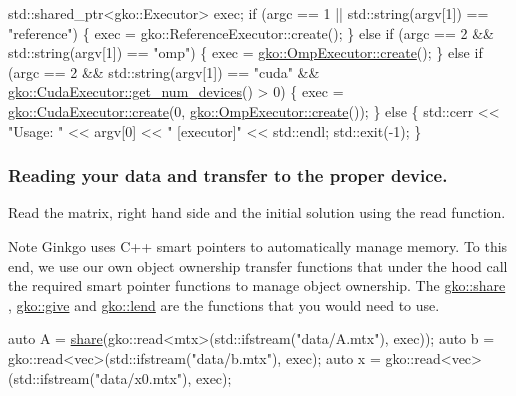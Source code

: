 \begin{DoxyCode}
std::shared\_ptr<gko::Executor> exec;
\textcolor{keywordflow}{if} (argc == 1 || std::string(argv[1]) == \textcolor{stringliteral}{"reference"}) \{
    exec = gko::ReferenceExecutor::create();
\} \textcolor{keywordflow}{else} \textcolor{keywordflow}{if} (argc == 2 && std::string(argv[1]) == \textcolor{stringliteral}{"omp"}) \{
    exec = \hyperlink{classgko_1_1OmpExecutor_a33ca05fdd0fc928ee262fc9425304874}{gko::OmpExecutor::create}();
\} \textcolor{keywordflow}{else} \textcolor{keywordflow}{if} (argc == 2 && std::string(argv[1]) == \textcolor{stringliteral}{"cuda"} &&
           \hyperlink{classgko_1_1CudaExecutor_aef0258494d14de0e56149b920c5173e5}{gko::CudaExecutor::get\_num\_devices}() > 0) \{
    exec = \hyperlink{classgko_1_1CudaExecutor_a2718a92034350650ef406ffdb60db090}{gko::CudaExecutor::create}(0, 
      \hyperlink{classgko_1_1OmpExecutor_a33ca05fdd0fc928ee262fc9425304874}{gko::OmpExecutor::create}());
\} \textcolor{keywordflow}{else} \{
    std::cerr << \textcolor{stringliteral}{"Usage: "} << argv[0] << \textcolor{stringliteral}{" [executor]"} << std::endl;
    std::exit(-1);
\}
\end{DoxyCode}


\label{_Readingyourdataandtransfertotheproperdevice}%
 \subsubsection*{Reading your data and transfer to the proper device.}

Read the matrix, right hand side and the initial solution using the read function. \begin{DoxyNote}{Note}
Ginkgo uses C++ smart pointers to automatically manage memory. To this end, we use our own object ownership transfer functions that under the hood call the required smart pointer functions to manage object ownership. The \hyperlink{namespacegko_a3ce296f73db0ff398bdea6009a3a5c58}{gko\+::share} , \hyperlink{namespacegko_acbd3fd6d07e498892881e8e2ab0b4167}{gko\+::give} and \hyperlink{namespacegko_aa8cb4876b72e5e1036ea9575443c439b}{gko\+::lend} are the functions that you would need to use.
\end{DoxyNote}

\begin{DoxyCode}
\textcolor{keyword}{auto} A = \hyperlink{namespacegko_a3ce296f73db0ff398bdea6009a3a5c58}{share}(gko::read<mtx>(std::ifstream(\textcolor{stringliteral}{"data/A.mtx"}), exec));
\textcolor{keyword}{auto} b = gko::read<vec>(std::ifstream(\textcolor{stringliteral}{"data/b.mtx"}), exec);
\textcolor{keyword}{auto} x = gko::read<vec>(std::ifstream(\textcolor{stringliteral}{"data/x0.mtx"}), exec);
\end{DoxyCode}



